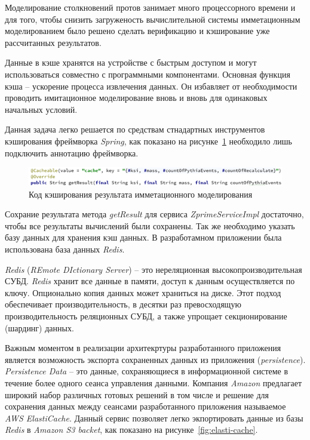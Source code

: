 Моделирование столкновений протов занимает много процессорного времени и для того, чтобы снизить загруженость вычислительной системы имметационным моделированием было решено сделать верификацию и кэширование уже рассчитанных результатов. 

Данные в кэше хранятся на устройстве с быстрым доступом и могут использоваться совместно с программными компонентами. Основная функция кэша – ускорение процесса извлечения данных. Он избавляет от необходимости проводить имитационное моделирование вновь и вновь для одинаковых начальных условий.

Данная задача легко решается по средствам стнадартных инструментов кэширования фреймворка \textit{Spring}, как показано на рисунке~\ref{fig:cache} необходило лишь подключить аннотацию фреймворка.

\begin{figure}[!h]
	\centering
	\includegraphics[width=\textwidth]{figures/cache.png}
	\caption{Код кэширования результата имметационного моделирования}
	\label{fig:cache}
\end{figure}

Сохрание результата метода \textit{getResult} для сервиса \textit{ZprimeServiceImpl} достаточно, чтобы все результаты вычислений были сохранены. Так же необходимо указать базу данных для хранения кэш данных. В разработамном приложении была использована база данных \textit{Redis}.

\textit{Redis} (\textit{REmote DIctionary Server}) -- это нереляционная высокопроизводительная СУБД. \textit{Redis} хранит все данные в памяти, доступ к данным осуществляется по ключу. Опционально копия данных может храниться на диске. Этот подход обеспечивает производительность, в десятки раз превосходящую производительность реляционных СУБД, а также упрощает секционирование (шардинг) данных.

Важным моментом в реализации архитекртуры разработанного приложения является возможность экспорта сохраненных данных из приложения (\textit{persistence}). \textit{Persistence Data} -- это данные, сохраняющиеся в информационной системе в течение более одного сеанса управления данными. Компания \textit{Amazon} предлагает широкий набор различных готовых решений в том числе и решение для сохранения данных между сеансами разработанного приложения называемое \textit{AWS ElastiCache}. Данный сервис позволяет легко экпортировать данные из базы \textit{Redis} в \textit{Amazon S3 backet}, как показано на рисунке~\ref{fig:elasti-cache}. 

